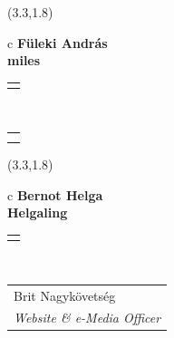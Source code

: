 \documentclass[11pt]{article}
\begin{document}
\makebox(3.3,1.8){
  \renewcommand\arraystretch{1.3}
  \begin{tabular}[c]{c}
    \hspace{8.5mm}
    \LARGE\bf{ Füleki András }\\
    \hspace{8.5mm}
    \Large{ miles }\\
    \renewcommand\arraystretch{3}
    \begin{tabular}[c]{c}
      \centering
      \fontfamily{phv}\selectfont{
        \textbf{
          \textsc{
            \scriptsize{
            \color{Bright}{ Ismerkedő }\color{Dark}{ Webmester }\color{Bright}{ Sminkmester }\color{Bright}{ Programozó }
            }
          }
        }
      }
    \end{tabular}
    \\
    \renewcommand\arraystretch{1}
    \begin{tabular}{p{3.3in}}
      \hspace{.7cm}\\
      \hspace{.7cm}\emph{  }\\
    \end{tabular}
  \end{tabular}
}

\makebox(3.3,1.8){
  \renewcommand\arraystretch{1.3}
  \begin{tabular}[c]{c}
    \hspace{8.5mm}
    \LARGE\bf{ Bernot Helga }\\
    \hspace{8.5mm}
    \Large{ Helgaling }\\
    \renewcommand\arraystretch{3}
    \begin{tabular}[c]{c}
      \centering
      \fontfamily{phv}\selectfont{
        \textbf{
          \textsc{
            \scriptsize{
            \color{Bright}{ Ismerkedő }\color{Dark}{ Webmester }\color{Dark}{ Sminkmester }\color{Bright}{ Programozó }
            }
          }
        }
      }
    \end{tabular}
    \\
    \renewcommand\arraystretch{1}
    \begin{tabular}{p{3.3in}}
      \hspace{.7cm}Brit Nagykövetség\\
      \hspace{.7cm}\emph{ Website \& e-Media Officer }\\
    \end{tabular}
  \end{tabular}
}
\end{document}
